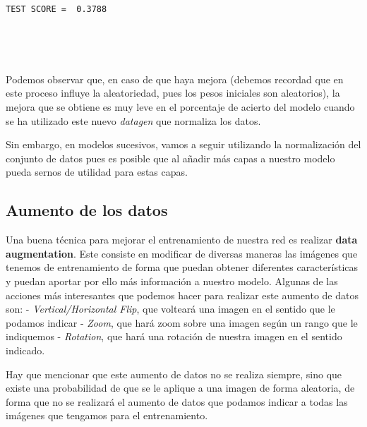 \documentclass[11pt]{article}
\begin{document}
    \begin{Verbatim}[commandchars=\\\{\}]
TEST SCORE =  0.3788
    \end{Verbatim}

    \begin{center}
    \end{center}
    { \hspace*{\fill} \\}
    
    \begin{center}
    \end{center}
    { \hspace*{\fill} \\}
    
    Podemos observar que, en caso de que haya mejora (debemos recordad que
en este proceso influye la aleatoriedad, pues los pesos iniciales son
aleatorios), la mejora que se obtiene es muy leve en el porcentaje de
acierto del modelo cuando se ha utilizado este nuevo \emph{datagen} que
normaliza los datos.

Sin embargo, en modelos sucesivos, vamos a seguir utilizando la
normalización del conjunto de datos pues es posible que al añadir más
capas a nuestro modelo pueda sernos de utilidad para estas capas.

\hypertarget{aumento-de-los-datos}{%
\subsection{Aumento de los datos}\label{aumento-de-los-datos}}

Una buena técnica para mejorar el entrenamiento de nuestra red es
realizar \textbf{data augmentation}. Este consiste en modificar de
diversas maneras las imágenes que tenemos de entrenamiento de forma que
puedan obtener diferentes características y puedan aportar por ello más
información a nuestro modelo. Algunas de las acciones más interesantes
que podemos hacer para realizar este aumento de datos son: -
\emph{Vertical/Horizontal Flip}, que volteará una imagen en el sentido
que le podamos indicar - \emph{Zoom}, que hará zoom sobre una imagen
según un rango que le indiquemos - \emph{Rotation}, que hará una
rotación de nuestra imagen en el sentido indicado.

Hay que mencionar que este aumento de datos no se realiza siempre, sino
que existe una probabilidad de que se le aplique a una imagen de forma
aleatoria, de forma que no se realizará el aumento de datos que podamos
indicar a todas las imágenes que tengamos para el entrenamiento.
\end{document}
